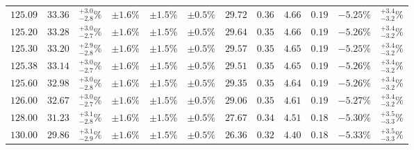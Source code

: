 \begin{landscape}
\begin{table}[ht!]
{\begin{tabular}{| cc | c | ccc | ccccc | c |}
$125.09$ & $33.36$ & $^{+3.0}_{-2.8}\%$ & $\pm 1.6\%$ & {\color{black!55}$\pm 1.5\%$} & {\color{black!55}$\pm 0.5\%$} & $29.72$ & $0.36$ & $4.66$ & $0.19$ & $-5.25\%$ & $^{+3.4}_{-3.2}\%$ \\
$125.20$ & $33.28$ & $^{+3.0}_{-2.7}\%$ & $\pm 1.6\%$ & {\color{black!55}$\pm 1.5\%$} & {\color{black!55}$\pm 0.5\%$} & $29.64$ & $0.35$ & $4.66$ & $0.19$ & $-5.26\%$ & $^{+3.4}_{-3.2}\%$ \\
$125.30$ & $33.20$ & $^{+2.9}_{-2.8}\%$ & $\pm 1.6\%$ & {\color{black!55}$\pm 1.5\%$} & {\color{black!55}$\pm 0.5\%$} & $29.57$ & $0.35$ & $4.65$ & $0.19$ & $-5.25\%$ & $^{+3.4}_{-3.2}\%$ \\
$125.38$ & $33.14$ & $^{+3.0}_{-2.7}\%$ & $\pm 1.6\%$ & {\color{black!55}$\pm 1.5\%$} & {\color{black!55}$\pm 0.5\%$} & $29.51$ & $0.35$ & $4.65$ & $0.19$ & $-5.26\%$ & $^{+3.4}_{-3.2}\%$ \\
$125.60$ & $32.98$ & $^{+3.0}_{-2.8}\%$ & $\pm 1.6\%$ & {\color{black!55}$\pm 1.5\%$} & {\color{black!55}$\pm 0.5\%$} & $29.35$ & $0.35$ & $4.64$ & $0.19$ & $-5.26\%$ & $^{+3.4}_{-3.2}\%$ \\
$126.00$ & $32.67$ & $^{+3.0}_{-2.7}\%$ & $\pm 1.6\%$ & {\color{black!55}$\pm 1.5\%$} & {\color{black!55}$\pm 0.5\%$} & $29.06$ & $0.35$ & $4.61$ & $0.19$ & $-5.27\%$ & $^{+3.4}_{-3.2}\%$ \\
$128.00$ & $31.23$ & $^{+3.1}_{-2.8}\%$ & $\pm 1.6\%$ & {\color{black!55}$\pm 1.5\%$} & {\color{black!55}$\pm 0.5\%$} & $27.67$ & $0.34$ & $4.51$ & $0.18$ & $-5.30\%$ & $^{+3.5}_{-3.3}\%$ \\
$130.00$ & $29.86$ & $^{+3.1}_{-2.9}\%$ & $\pm 1.6\%$ & {\color{black!55}$\pm 1.5\%$} & {\color{black!55}$\pm 0.5\%$} & $26.36$ & $0.32$ & $4.40$ & $0.18$ & $-5.33\%$ & $^{+3.5}_{-3.3}\%$ \\
\cline{1-12}
\end{tabular}
}
\end{table}

\FloatBarrier
\end{landscape}
